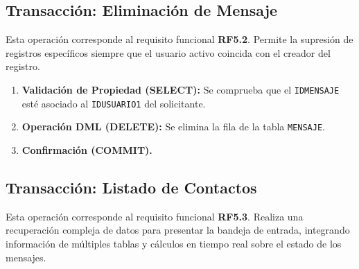 \subsection{Transacción: Eliminación de Mensaje}
Esta operación corresponde al requisito funcional \textbf{RF5.2}. Permite la supresión de registros específicos siempre que el usuario activo coincida con el creador del registro.

\begin{enumerate}
    \item \textbf{Validación de Propiedad (SELECT):} Se comprueba que el \texttt{IDMENSAJE} esté asociado al \texttt{IDUSUARIO1} del solicitante.
    \item \textbf{Operación DML (DELETE):} Se elimina la fila de la tabla \texttt{MENSAJE}.
    \item \textbf{Confirmación (COMMIT).}
\end{enumerate}

\subsection{Transacción: Listado de Contactos}
Esta operación corresponde al requisito funcional \textbf{RF5.3}. Realiza una recuperación compleja de datos para presentar la bandeja de entrada, integrando información de múltiples tablas y cálculos en tiempo real sobre el estado de los mensajes.

